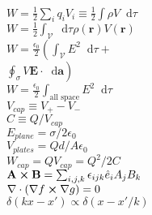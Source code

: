 \documentclass[12pt]{article}
\newcommand*\diff{\mathop{}\!\mathrm{d}}
\newcommand{\epn}{\epsilon_0}
\begin{document}
{{	$W=\frac{1}{2}\sum_iq_iV_i\equiv\frac{1}{2}\int\rho V\diff \tau$
	\\$W = \frac{1}{2}\int_{\mathcal{V}}\diff\tau\rho(\mathbf{r})V(\mathbf{r})$
	\\$W=\frac{\epn}{2}\left(\int_{\mathcal{V}}E^2\diff\tau+\right.$
	\\$\left.\oint_\sigma V\mathbf{E}\cdot\diff\mathbf{a}\right)$
	\\$W = \frac{\epn}{2}\int_\text{all space} E^2 \diff\tau$
	\\$V_{cap}\equiv V_+-V_-$
	\\$C\equiv Q/V_{cap}$
	\\$E_{plane} = \sigma/2\epn$
	\\$V_{plates} = Qd/A\epn$
	\\$W_{cap}=QV_{cap}=Q^2/2C$
	\\$\mathbf{A}\cross\mathbf{B}=\sum_{i,j,k}\epsilon_{ijk}\hat{e}_iA_jB_k$
	\\$\nabla\cdot(\nabla f\cross \nabla g) = 0$
	\\$\delta(kx-x')\propto\delta(x-x'/k)$
}
}
\\
\end{document}
